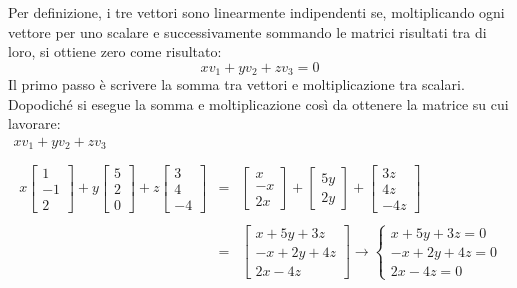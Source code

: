 \documentclass[a4paper]{article}
\begin{document}
	\noindent
	Per definizione, i tre vettori sono linearmente indipendenti se, moltiplicando ogni vettore per uno scalare e successivamente sommando le matrici risultati tra di loro, si ottiene zero come risultato:
	\begin{equation*}
		xv_{1} + yv_{2} + zv_{3} = 0
	\end{equation*}
	Il \textcolor{Red3}{primo passo} è scrivere la somma tra vettori e moltiplicazione tra scalari. Dopodiché si esegue la somma e moltiplicazione così da ottenere la matrice su cui lavorare:
	\begin{gather*}
		xv_{1} + yv_{2} + zv_{3} \\
		\\
		\begin{array}{lll}
			x\begin{bmatrix}
				1  \\
				-1 \\
				2
			\end{bmatrix} +
			y\begin{bmatrix}
				5 \\
				2 \\
				0
			\end{bmatrix} +
			z\begin{bmatrix}
				3 \\
				4 \\
				-4
			\end{bmatrix} & = &
			\begin{bmatrix}
				x  \\
				-x \\
				2x
			\end{bmatrix} +
			\begin{bmatrix}
				5y \\
				2y
			\end{bmatrix} +
			\begin{bmatrix}
				3z \\
				4z \\
				-4z
			\end{bmatrix} \\
			\\
			& = &
			\begin{bmatrix}
				x + 5y + 3z  \\
				-x + 2y + 4z \\
				2x - 4z
			\end{bmatrix} \longrightarrow
			\begin{cases}
				x + 5y + 3z = 0  \\
				-x + 2y + 4z = 0 \\
				2x - 4z = 0
			\end{cases}
		\end{array}
	\end{gather*}
\end{document}
